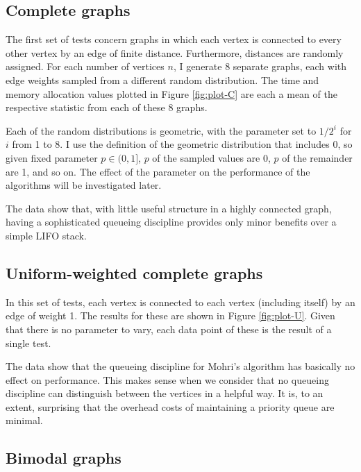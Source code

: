 \subsection{Complete graphs}\label{sec:complete-graphs}

The first set of tests concern graphs in which each vertex is connected to every other vertex by an edge of finite distance.
Furthermore, distances are randomly assigned.
For each number of vertices $n$, I generate 8 separate graphs, each with edge weights sampled from a different random distribution.
The time and memory allocation values plotted in Figure \ref{fig:plot-C} are each a mean of the respective statistic from each of these 8 graphs.

Each of the random distributions is geometric, with the parameter set to $1/2^i$ for $i$ from 1 to 8.
I use the definition of the geometric distribution that includes 0, so given fixed parameter $p \in (0,1]$, $p$ of the sampled values are 0, $p$ of the remainder are 1, and so on.
The effect of the parameter on the performance of the algorithms will be investigated later.

The data show that, with little useful structure in a highly connected graph, having a sophisticated queueing discipline provides only minor benefits over a simple LIFO stack.


\subsection{Uniform-weighted complete graphs}

In this set of tests, each vertex is connected to each vertex (including itself) by an edge of weight 1.
The results for these are shown in Figure \ref{fig:plot-U}.
Given that there is no parameter to vary, each data point of these is the result of a single test.

The data show that the queueing discipline for Mohri's algorithm has basically no effect on performance.
This makes sense when we consider that no queueing discipline can distinguish between the vertices in a helpful way.
It is, to an extent, surprising that the overhead costs of maintaining a priority queue are minimal.


\subsection{Bimodal graphs}

